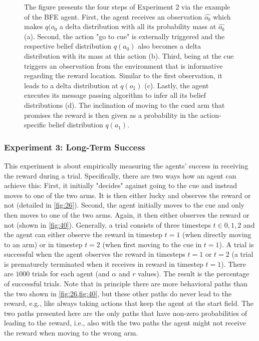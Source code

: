 \begin{figure}[!htb]
{\begin{tikzpicture}
        \end{tikzpicture}
    }
    \caption{The figure presents the four steps of Experiment 2 via the example of the BFE agent. First, the agent receives an observation \(\hat {o_0}\) which makes \(q(o_0\) a delta distribution with all its probability mass at \(\hat {o_0}\) (a). Second, the action "go to cue" is externally triggered and the respective belief distribution \(q(a_0)\) also becomes a delta distribution with its mass at this action (b). Third, being at the cue triggers an observation from the environment that is informative regarding the reward location. Similar to the first observation, it leads to a delta distribution at \(q(o_1)\) (c). Lastly, the agent executes its message passing algorithm to infer all its belief distributions (d). The inclination of moving to the cued arm that promises the reward is then given as a probability in the action-specific belief distribution \(q(a_1)\).}
    \label{fig:25}
\end{figure}


\subsubsection{Experiment 3: Long-Term Success}

This experiment is about empirically measuring the agents' success in receiving the reward during a trial. Specifically, there are two ways how an agent can achieve this: First, it initially "decides" against going to the cue and instead moves to one of the two arms. It is then either lucky and observes the reward or not (detailed in \cref{fig:26}). Second, the agent initially moves to the cue and only then moves to one of the two arms. Again, it then either observes the reward or not (shown in \cref{fig:40}). Generally, a trial consists of three timesteps \(t \in {0,1,2}\) and the agent can either observe the reward in timestep \(t=1\) (when directly moving to an arm) or in timestep \(t=2\) (when first moving to the cue in \(t=1\)). A trial is successful when the agent observes the reward in timesteps \(t=1\) or \(t=2\) (a trial is prematurely terminated when it receives in reward in timestep \(t=1\)). There are \(1000\) trials for each agent (and \(\alpha\) and \(r\) values). The result is the percentage of successful trials. Note that in principle there are more behavioral paths than the two shown in \cref{fig:26,fig:40}, but these other paths do never lead to the reward, e.g., like always taking actions that keep the agent at the start field. The two paths presented here are the only paths that have non-zero probabilities of leading to the reward, i.e., also with the two paths the agent might not receive the reward when moving to the wrong arm.

